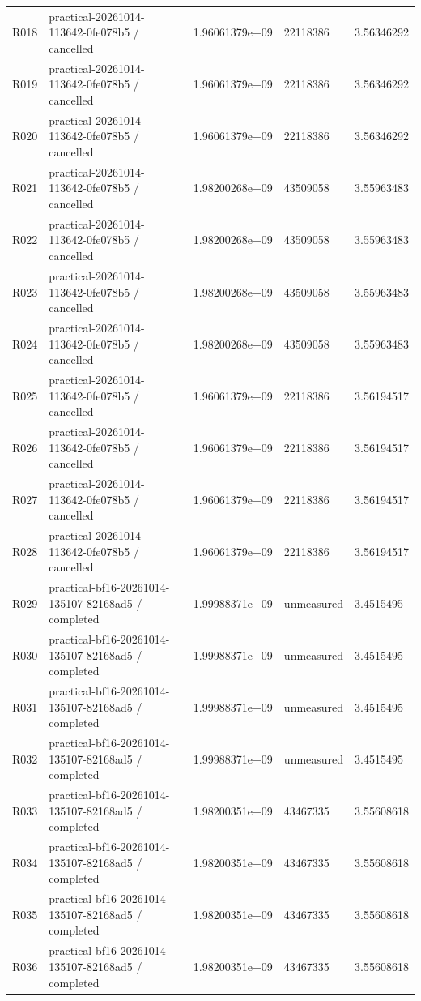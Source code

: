 \documentclass[10pt]{article}
\begin{document}
{\begin{longtable}{p{}p{}p{}p{}p{}}
R018 & practical-20261014-113642-0fe078b5 / cancelled & 1.96061379e+09 & 22118386 & 3.56346292 \\
R019 & practical-20261014-113642-0fe078b5 / cancelled & 1.96061379e+09 & 22118386 & 3.56346292 \\
R020 & practical-20261014-113642-0fe078b5 / cancelled & 1.96061379e+09 & 22118386 & 3.56346292 \\
R021 & practical-20261014-113642-0fe078b5 / cancelled & 1.98200268e+09 & 43509058 & 3.55963483 \\
R022 & practical-20261014-113642-0fe078b5 / cancelled & 1.98200268e+09 & 43509058 & 3.55963483 \\
R023 & practical-20261014-113642-0fe078b5 / cancelled & 1.98200268e+09 & 43509058 & 3.55963483 \\
R024 & practical-20261014-113642-0fe078b5 / cancelled & 1.98200268e+09 & 43509058 & 3.55963483 \\
R025 & practical-20261014-113642-0fe078b5 / cancelled & 1.96061379e+09 & 22118386 & 3.56194517 \\
R026 & practical-20261014-113642-0fe078b5 / cancelled & 1.96061379e+09 & 22118386 & 3.56194517 \\
R027 & practical-20261014-113642-0fe078b5 / cancelled & 1.96061379e+09 & 22118386 & 3.56194517 \\
R028 & practical-20261014-113642-0fe078b5 / cancelled & 1.96061379e+09 & 22118386 & 3.56194517 \\
R029 & practical-bf16-20261014-135107-82168ad5 / completed & 1.99988371e+09 & unmeasured & 3.4515495 \\
R030 & practical-bf16-20261014-135107-82168ad5 / completed & 1.99988371e+09 & unmeasured & 3.4515495 \\
R031 & practical-bf16-20261014-135107-82168ad5 / completed & 1.99988371e+09 & unmeasured & 3.4515495 \\
R032 & practical-bf16-20261014-135107-82168ad5 / completed & 1.99988371e+09 & unmeasured & 3.4515495 \\
R033 & practical-bf16-20261014-135107-82168ad5 / completed & 1.98200351e+09 & 43467335 & 3.55608618 \\
R034 & practical-bf16-20261014-135107-82168ad5 / completed & 1.98200351e+09 & 43467335 & 3.55608618 \\
R035 & practical-bf16-20261014-135107-82168ad5 / completed & 1.98200351e+09 & 43467335 & 3.55608618 \\
R036 & practical-bf16-20261014-135107-82168ad5 / completed & 1.98200351e+09 & 43467335 & 3.55608618 \\

\end{longtable}}
\end{document}
